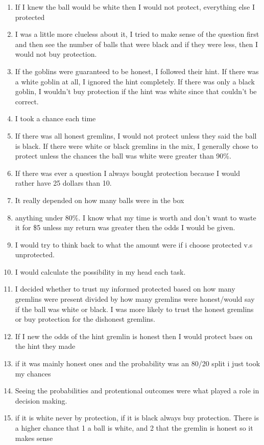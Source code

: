 \documentclass[12pt,a4paper]{article}
\begin{document}
\begin{appendices}
\begin{enumerate}
\item If I knew the ball would be white then I would not protect, everything else I protected

\item I was a little more clueless about it, I tried to make sense of the question first and then see the number of balls that were black and if they were less, then I would not buy protection.

\item If the goblins were guaranteed to be honest, I followed their hint. If there was a white goblin at all, I ignored the hint completely. If there was only a black goblin, I wouldn't buy protection if the hint was white since that couldn't be correct.

\item I took a chance each time
\item If there was all honest gremlins, I would not protect unless they said the ball is black. If there were white or black gremlins in the mix, I generally chose to protect unless the chances the ball was white were greater than 90\%.
\item If there was ever a question I always bought protection because I would rather have 25 dollars than 10.
\item It really depended on how many balls were in the box 
\item anything under 80\%. I know what my time is worth and don't want to waste it for \$5 unless my return was greater then the odds I would be given. 
\item I would try to think back to what the amount were if i choose protected v.s unprotected. 
\item I would calculate the possibility in my head each task.
\item I decided whether to trust my informed protected based on how many gremlins were present divided by how many gremlins were honest/would say if the ball was white or black. I was more likely to trust the honest gremlins or buy protection for the dishonest gremlins.
\item If I new the odds of the hint gremlin is honest then I would protect baes on the hint they made
\item if it was mainly honest ones and the probability was an 80/20 split i just took my chances 
\item Seeing the probabilities and protentional outcomes were what played a role in decision making.
\item if it is white never by protection, if it is black always buy protection. There is a higher chance that 1 a ball is white, and 2 that the gremlin is honest so it makes sense 

\end{enumerate}
\end{appendices}
\end{document}
